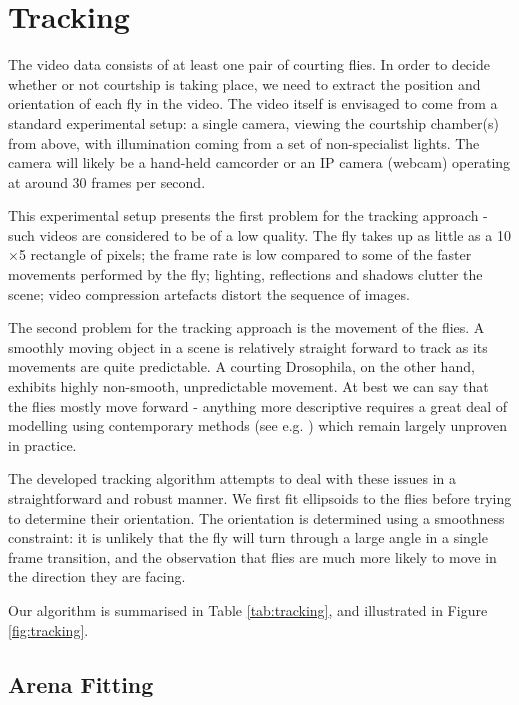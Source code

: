 \documentclass[twocolumn]{article}
\begin{document}
\section{Tracking}
\label{sec:tracking}

The video data consists of at least one pair of courting flies. In order to decide whether or not courtship is taking place, we need to extract the position and orientation of each fly in the video. The video itself is envisaged to come from a standard experimental setup: a single camera, viewing the courtship chamber(s) from above, with illumination coming from a set of non-specialist lights. The camera will likely be a hand-held camcorder or an IP camera (webcam) operating at around 30 frames per second. 

This experimental setup presents the first problem for the tracking approach - such videos are considered to be of a low quality. The fly takes up as little as a 10$\times$5 rectangle of pixels; the frame rate is low compared to some of the faster movements performed by the fly; lighting, reflections and shadows clutter the scene; video compression artefacts distort the sequence of images. 

The second problem for the tracking approach is the movement of the flies. A smoothly moving object in a scene is relatively straight forward to track as its movements are quite predictable. A courting Drosophila, on the other hand, exhibits highly non-smooth, unpredictable movement. At best we can say that the flies mostly move forward - anything more descriptive requires a great deal of modelling using contemporary methods (see e.g. \cite{Oh}) which remain largely unproven in practice.

The developed tracking algorithm attempts to deal with these issues in a straightforward and robust manner. We first fit ellipsoids to the flies before trying to determine their orientation. The orientation is determined using a smoothness constraint: it is unlikely that the fly will turn through a large angle in a single frame transition, and the observation that flies are much more likely to move in the direction they are facing.

Our algorithm is summarised in Table \ref{tab:tracking}, and illustrated in Figure \ref{fig:tracking}.

\subsection{Arena Fitting}
\end{document}

